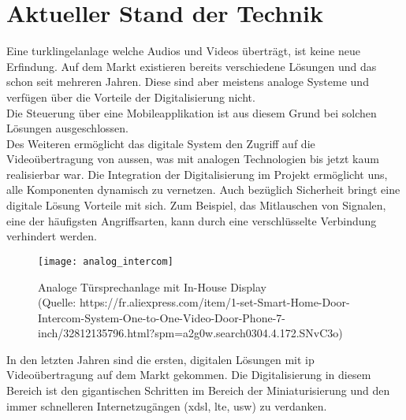 \section{Aktueller Stand der Technik}
\label{sec:chapterexample}
Eine \gls{turklingelanlage} welche Audios und Videos überträgt, ist keine neue Erfindung. Auf dem Markt existieren bereits verschiedene Lösungen und das schon seit mehreren Jahren. Diese sind aber meistens analoge Systeme und verfügen über die Vorteile der Digitalisierung nicht. 
\\
Die Steuerung über eine Mobileapplikation ist aus diesem Grund bei solchen Lösungen ausgeschlossen.
\\
Des Weiteren ermöglicht das digitale System den Zugriff auf die Videoübertragung von aussen, was mit analogen Technologien bis jetzt kaum realisierbar war.
Die Integration der Digitalisierung im Projekt ermöglicht uns, alle Komponenten dynamisch zu vernetzen. Auch bezüglich Sicherheit bringt eine digitale Lösung Vorteile mit sich. Zum Beispiel, das Mitlauschen von Signalen, eine der häufigsten Angriffsarten, kann durch eine verschlüsselte Verbindung verhindert werden.


\begin{figure}[htb!]
	\begin{center}
		\texttt{[image: analog\_intercom]}
		\caption[Analoge Türsprechanlage mit In-House Display]{Analoge Türsprechanlage mit In-House Display \\(Quelle: https://fr.aliexpress.com/item/1-set-Smart-Home-Door-Intercom-System-One-to-One-Video-Door-Phone-7-inch/32812135796.html?spm=a2g0w.search0304.4.172.SNvC3o)}
		\label{fig:analoge_intercom}
	\end{center}
\end{figure}
In den letzten Jahren sind die ersten, digitalen Lösungen mit \gls{ip} Videoübertragung auf dem Markt gekommen. Die Digitalisierung in diesem Bereich ist den gigantischen Schritten im Bereich der Miniaturisierung und den immer schnelleren Internetzugängen (x\gls{dsl}, \gls{lte}, usw) zu verdanken.
\\


